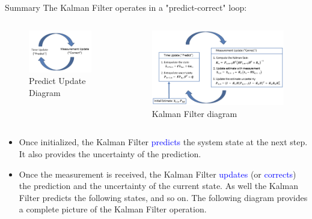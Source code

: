 \begin{frame}{Summary}
The Kalman Filter operates in a "predict-correct"
loop:
\begin{columns}
        \begin{figure}
            \centering
            \includegraphics[width=0.6\linewidth]{Figures//Chapter2/Predict_Update_KF.png}
            \caption{Predict Update Diagram}
            \label{fig:PredictUpdateDiagram}
        \end{figure}
        \begin{figure}
            \centering
            \includegraphics[width=1\linewidth]{Figures//Chapter2/KF_Diagram.png}
            \caption{Kalman Filter diagram}
            \label{fig:KF_Diagram}
        \end{figure}
\end{columns}
\begin{itemize}
    \item Once initialized, the Kalman Filter \textcolor{blue}{predicts} the system state at the next step. It also provides the uncertainty of the prediction.
    \item Once the measurement is received, the Kalman Filter \textcolor{blue}{updates} (or \textcolor{blue}{corrects}) the prediction and the uncertainty of the current state. As well the Kalman Filter predicts the following states, and so on. The following diagram provides a complete picture of the Kalman Filter operation.
\end{itemize}
    
\end{frame}

